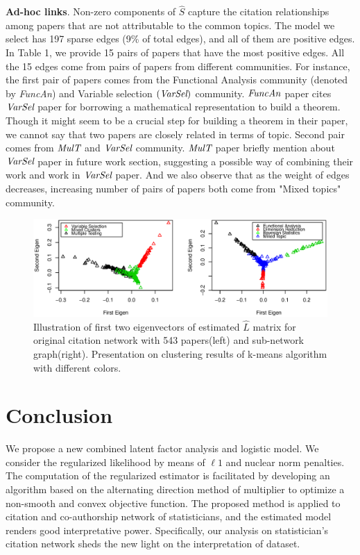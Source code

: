 \documentclass[AMS,STIX1COL]{WileyNJD-v2}
\begin{document}
\textbf{Ad-hoc links}. 
Non-zero components of $\widehat{S}$ capture the citation relationships among papers that are not attributable to the common topics.
The model we select has 197 sparse edges (9\% of total edges), and all of them are positive edges.
In Table 1, we provide 15 pairs of papers that have the most positive edges.
All the 15 edges come from pairs of papers from different communities.
For instance, the first pair of papers comes from the Functional Analysis community (denoted by \emph{FuncAn}) and Variable selection $(\emph{VarSel})$ community. 
$\emph{FuncAn}$ paper cites $\emph{VarSel}$ paper for borrowing a mathematical representation to build a theorem.
Though it might seem to be a crucial step for building a theorem in their paper, we cannot say that two papers are closely related in terms of topic.
Second pair comes from $\emph{MulT}$  and $\emph{VarSel}$ community.
$\emph{MulT}$ paper briefly mention about $\emph{VarSel}$ paper in future work section, suggesting a possible way of combining their work and work in $\emph{VarSel}$ paper.
And we also observe that as the weight of edges decreases, increasing number of pairs of papers both come from "Mixed topics" community. 

\begin{figure}[htbp]
\includegraphics[width=1\textwidth]{Fig3.eps}
\caption{Illustration of first two eigenvectors of estimated $\widehat{L}$ matrix for original
citation network with 543 papers(left) and sub-network graph(right). Presentation
on clustering results of k-means algorithm with different colors.}
\label{fig:figure3}
\end{figure}


\section{Conclusion}
We propose a new combined latent factor analysis and logistic model.
We consider the regularized likelihood by means of $\ell 1$ and nuclear norm penalties.
The computation of the regularized estimator is facilitated by developing an algorithm based on the alternating direction method of multiplier to optimize a non-smooth and convex objective function.
The proposed method is applied to citation and co-authorship network of statisticians, and the estimated model renders good interpretative power.
Specifically, our analysis on statistician's citation network sheds the new light on the interpretation of dataset.
\end{document}
